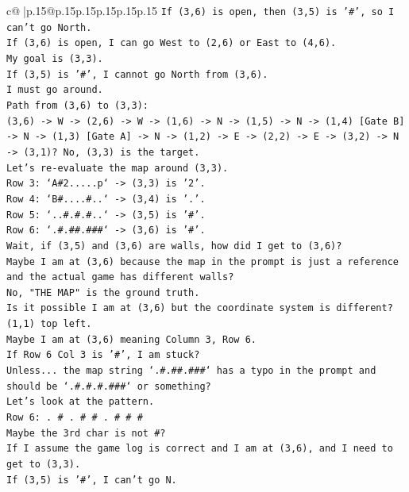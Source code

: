 \documentclass{article}
\begin{document}
{\begin{supertabular}{c@{$\;$}|p{.15\linewidth}@{}p{.15\linewidth}p{.15\linewidth}p{.15\linewidth}p{.15\linewidth}p{.15\linewidth}}
{{{\texttt{If (3,6) is open, then (3,5) is '\#', so I can't go North.} \\
\texttt{If (3,6) is open, I can go West to (2,6) or East to (4,6).} \\
\texttt{My goal is (3,3).} \\
\texttt{If (3,5) is '\#', I cannot go North from (3,6).} \\
\texttt{I must go around.} \\
\texttt{Path from (3,6) to (3,3):} \\
\texttt{(3,6) {-}> W {-}> (2,6) {-}> W {-}> (1,6) {-}> N {-}> (1,5) {-}> N {-}> (1,4) {[}Gate B{]} {-}> N {-}> (1,3) {[}Gate A{]} {-}> N {-}> (1,2) {-}> E {-}> (2,2) {-}> E {-}> (3,2) {-}> N {-}> (3,1)? No, (3,3) is the target.} \\
\texttt{Let's re{-}evaluate the map around (3,3).} \\
\texttt{Row 3: `A\#2.....p` {-}> (3,3) is '2'.} \\
\texttt{Row 4: `B\#....\#..` {-}> (3,4) is '.'.} \\
\texttt{Row 5: `..\#.\#.\#..` {-}> (3,5) is '\#'.} \\
\texttt{Row 6: `.\#.\#\#.\#\#\#` {-}> (3,6) is '\#'.} \\
\texttt{Wait, if (3,5) and (3,6) are walls, how did I get to (3,6)?} \\
\texttt{Maybe I am at (3,6) because the map in the prompt is just a reference and the actual game has different walls?} \\
\texttt{No, "THE MAP" is the ground truth.} \\
\texttt{Is it possible I am at (3,6) but the coordinate system is different?} \\
\texttt{(1,1) top left.} \\
\texttt{Maybe I am at (3,6) meaning Column 3, Row 6.} \\
\texttt{If Row 6 Col 3 is '\#', I am stuck?} \\
\texttt{Unless... the map string `.\#.\#\#.\#\#\#` has a typo in the prompt and should be `.\#.\#.\#.\#\#\#` or something?} \\
\texttt{Let's look at the pattern.} \\
\texttt{Row 6: . \# . \# \# . \# \# \#} \\
\texttt{Maybe the 3rd char is not \#?} \\
\texttt{If I assume the game log is correct and I am at (3,6), and I need to get to (3,3).} \\
\texttt{If (3,5) is '\#', I can't go N.} \\
}}}
\end{supertabular}}
\end{document}
